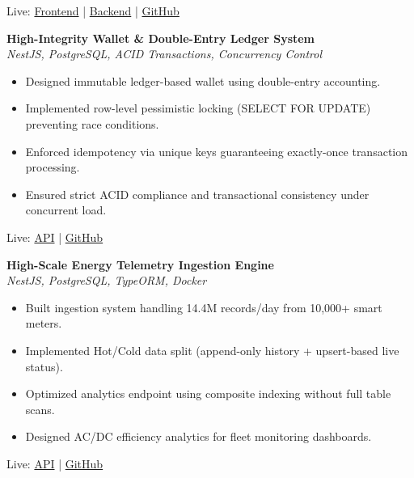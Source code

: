 \documentclass[letterpaper,11pt]{article}
\begin{document}
Live: \href{https://intelligence-tracker-frontend.vercel.app}{Frontend} \quad | \quad
\href{https://web-production-035fb.up.railway.app}{Backend} \quad | \quad
\href{https://github.com/Ujjuanku/Intelligence_Tracker_Merge}{GitHub}

\vspace{8pt}

\textbf{High-Integrity Wallet \& Double-Entry Ledger System} \\
\textit{NestJS, PostgreSQL, ACID Transactions, Concurrency Control}

\begin{itemize}
\item Designed immutable ledger-based wallet using double-entry accounting.
\item Implemented row-level pessimistic locking (SELECT FOR UPDATE) preventing race conditions.
\item Enforced idempotency via unique keys guaranteeing exactly-once transaction processing.
\item Ensured strict ACID compliance and transactional consistency under concurrent load.
\end{itemize}

Live: \href{https://walletservice-production-e07a.up.railway.app}{API} \quad | \quad
\href{https://github.com/Ujjuanku/Wallet_Service}{GitHub}

\vspace{8pt}

\textbf{High-Scale Energy Telemetry Ingestion Engine} \\
\textit{NestJS, PostgreSQL, TypeORM, Docker}

\begin{itemize}
\item Built ingestion system handling 14.4M records/day from 10,000+ smart meters.
\item Implemented Hot/Cold data split (append-only history + upsert-based live status).
\item Optimized analytics endpoint using composite indexing without full table scans.
\item Designed AC/DC efficiency analytics for fleet monitoring dashboards.
\end{itemize}

Live: \href{https://energy-ingestion.onrender.com}{API} \quad | \quad
\href{https://github.com/Ujjuanku/Energy-Ingestion}{GitHub}

\vspace{8pt}
\end{document}
